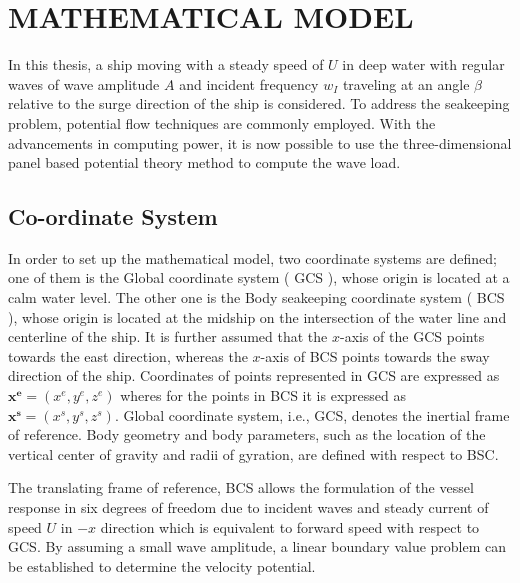 \chapter{MATHEMATICAL MODEL}
In this thesis, a ship moving with a steady speed of $U$ in deep water with regular 
waves of wave amplitude $A$ and incident frequency $w_I$ traveling at an angle 
$\beta$ relative to the surge direction of the ship is considered. To address the seakeeping
problem, potential flow techniques are commonly employed. With the advancements in computing power, 
it is now possible to use the three-dimensional panel based potential theory method to compute 
the wave load.

\section{Co-ordinate System}

In order to set up the mathematical model, two coordinate systems are defined; one of them is the 
Global coordinate system ( GCS ), whose origin is located at a calm water level. The other one is 
the Body seakeeping coordinate system ( BCS ), whose origin is located at the midship on the 
intersection of the water line and centerline of the ship. It is further assumed that the $x$-axis 
of the GCS points towards the east direction, whereas the $x$-axis of BCS points towards the sway 
direction of the ship. Coordinates of points represented in GCS are expressed as 
$\boldsymbol{x^e} = (x^e, y^e, z^e)$ wheres for the points in BCS it is expressed as 
$\boldsymbol{x^s} = (x^s, y^s, z^s)$. Global coordinate system, i.e., GCS, 
denotes the inertial frame of reference. Body geometry and body parameters, 
such as the location of the vertical center of gravity and radii of gyration, 
are defined with respect to BSC.

The translating frame of reference, BCS allows the formulation of the vessel response in 
six degrees of freedom due to incident waves and steady current of speed $U$ in $-x$ direction 
which is equivalent to forward speed with respect to GCS. By assuming a small wave amplitude, 
a linear boundary value problem can be established to determine the velocity potential.


